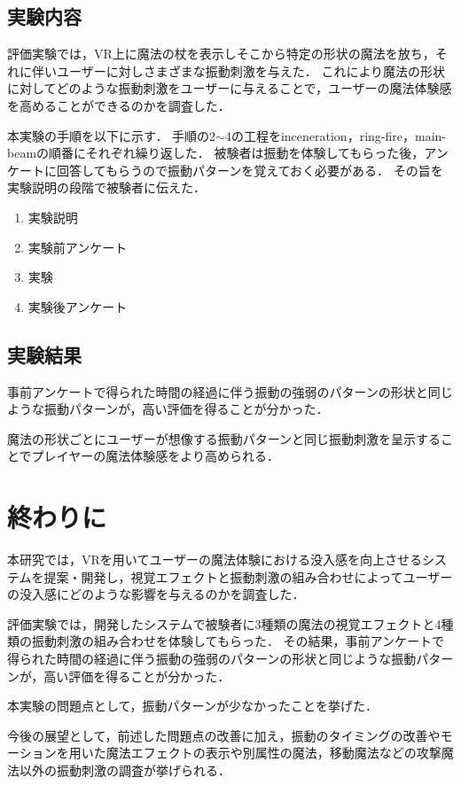 \documentclass[uplatex]{jsarticle}   %
\begin{document}
\subsection{実験内容}
評価実験では，VR上に魔法の杖を表示しそこから特定の形状の魔法を放ち，それに伴いユーザーに対しさまざまな振動刺激を与えた．
これにより魔法の形状に対してどのような振動刺激をユーザーに与えることで，ユーザーの魔法体験感を高めることができるのかを調査した．

本実験の手順を以下に示す．
手順の2$\sim$4の工程をinceneration，ring-fire，main-beamの順番にそれぞれ繰り返した．
被験者は振動を体験してもらった後，アンケートに回答してもらうので振動パターンを覚えておく必要がある．
その旨を実験説明の段階で被験者に伝えた．

\begin{enumerate}
    \item 実験説明
    \item 実験前アンケート
    \item 実験
    \item 実験後アンケート
\end{enumerate}

\subsection{実験結果}
事前アンケートで得られた時間の経過に伴う振動の強弱のパターンの形状と同じような振動パターンが，高い評価を得ることが分かった．

魔法の形状ごとにユーザーが想像する振動パターンと同じ振動刺激を呈示することでプレイヤーの魔法体験感をより高められる．


\section{終わりに}
本研究では，VRを用いてユーザーの魔法体験における没入感を向上させるシステムを提案・開発し，視覚エフェクトと振動刺激の組み合わせによってユーザーの没入感にどのような影響を与えるのかを調査した．

評価実験では，開発したシステムで被験者に3種類の魔法の視覚エフェクトと4種類の振動刺激の組み合わせを体験してもらった．
その結果，事前アンケートで得られた時間の経過に伴う振動の強弱のパターンの形状と同じような振動パターンが，高い評価を得ることが分かった．

本実験の問題点として，振動パターンが少なかったことを挙げた．

今後の展望として，前述した問題点の改善に加え，振動のタイミングの改善やモーションを用いた魔法エフェクトの表示や別属性の魔法，移動魔法などの攻撃魔法以外の振動刺激の調査が挙げられる．



\end{document}
